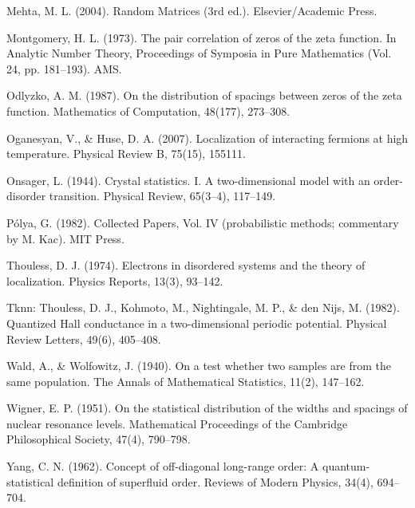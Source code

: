 \documentclass[10pt]{article}
\begin{document}
\begin{enumerate}[label={[\arabic*]}, leftmargin=2.2em, itemsep=1pt]
\item Mehta, M. L. (2004). Random Matrices (3rd ed.). Elsevier/Academic Press.

\item Montgomery, H. L. (1973). The pair correlation of zeros of the zeta function. In Analytic Number Theory, Proceedings of Symposia in Pure Mathematics (Vol. 24, pp. 181--193). AMS.

\item Odlyzko, A. M. (1987). On the distribution of spacings between zeros of the zeta function. Mathematics of Computation, 48(177), 273--308.

\item Oganesyan, V., \& Huse, D. A. (2007). Localization of interacting fermions at high temperature. Physical Review B, 75(15), 155111.

\item Onsager, L. (1944). Crystal statistics. I. A two-dimensional model with an order-disorder transition. Physical Review, 65(3--4), 117--149.

\item P\'olya, G. (1982). Collected Papers, Vol. IV (probabilistic methods; commentary by M. Kac). MIT Press.

\item Thouless, D. J. (1974). Electrons in disordered systems and the theory of localization. Physics Reports, 13(3), 93--142.

\item Tknn: Thouless, D. J., Kohmoto, M., Nightingale, M. P., \& den Nijs, M. (1982). Quantized Hall conductance in a two-dimensional periodic potential. Physical Review Letters, 49(6), 405--408.

\item Wald, A., \& Wolfowitz, J. (1940). On a test whether two samples are from the same population. The Annals of Mathematical Statistics, 11(2), 147--162.

\item Wigner, E. P. (1951). On the statistical distribution of the widths and spacings of nuclear resonance levels. Mathematical Proceedings of the Cambridge Philosophical Society, 47(4), 790--798.

\item Yang, C. N. (1962). Concept of off-diagonal long-range order: A quantum-statistical definition of superfluid order. Reviews of Modern Physics, 34(4), 694--704.

\end{enumerate}
\end{document}
